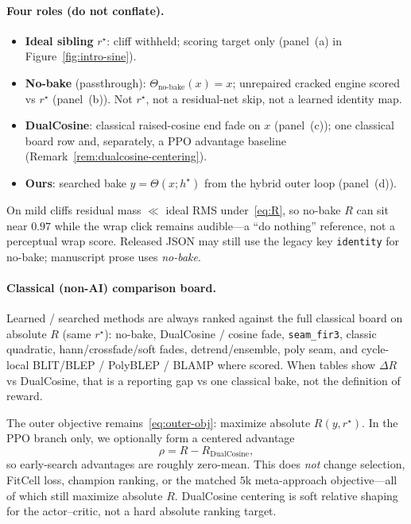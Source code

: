 \paragraph{Four roles (do not conflate).}
\label{sec:four-roles}
\begin{itemize}
  \item \textbf{Ideal sibling} $r^{\star}$: cliff withheld; scoring target only (panel~(a) in Figure~\ref{fig:intro-sine}).
  \item \textbf{No-bake} (passthrough): $\Theta_{\mathrm{no\text{-}bake}}(x)=x$; unrepaired cracked engine scored vs $r^{\star}$ (panel~(b)). Not $r^{\star}$, not a residual-net skip, not a learned identity map.
  \item \textbf{DualCosine}: classical raised-cosine end fade on $x$ (panel~(c)); one classical board row and, separately, a PPO advantage baseline (Remark~\ref{rem:dualcosine-centering}).
  \item \textbf{Ours}: searched bake $y=\Theta(x;h^{\star})$ from the hybrid outer loop (panel~(d)).
\end{itemize}
On mild cliffs residual mass $\ll$ ideal RMS under~\eqref{eq:R}, so no-bake $R$ can sit near $0.97$ while the wrap click remains audible---a ``do nothing'' reference, not a perceptual wrap score.
Released JSON may still use the legacy key \texttt{identity} for no-bake; manuscript prose uses \emph{no-bake}.

\paragraph{Classical (non-AI) comparison board.}
\label{sec:classical-board}
Learned / searched methods are always ranked against the full classical board on absolute $R$ (same $r^{\star}$):
no-bake, DualCosine / cosine fade, \texttt{seam\_fir3}, classic quadratic, hann/crossfade/soft fades, detrend/ensemble, poly seam, and cycle-local BLIT/BLEP / PolyBLEP / BLAMP where scored.
When tables show $\Delta R$ vs DualCosine, that is a reporting gap vs one classical bake, not the definition of reward.

\begin{remark}
\label{rem:dualcosine-centering}
The outer objective remains~\eqref{eq:outer-obj}: maximize absolute $R(y,r^{\star})$.
In the PPO branch only, we optionally form a centered advantage
\begin{equation}
\label{eq:dualcosine-centering}
\rho = R - R_{\mathrm{DualCosine}},
\end{equation}
so early-search advantages are roughly zero-mean.
This does \emph{not} change selection, FitCell loss, champion ranking, or the matched $5$k meta-approach objective---all of which still maximize absolute $R$.
DualCosine centering is soft relative shaping for the actor--critic, not a hard absolute ranking target.
\end{remark}

